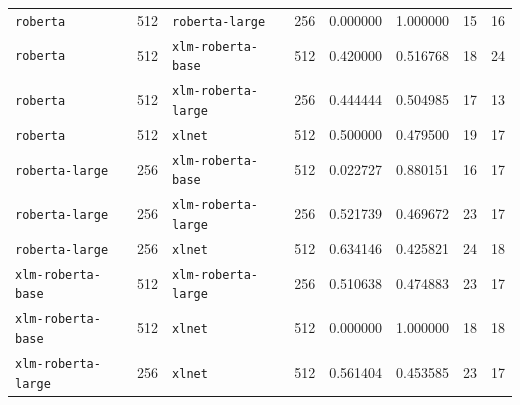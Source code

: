 \documentclass[11pt]{article}
\begin{document}
\begin{landscape}
\begin{longtable}{llllcccc}
\texttt{roberta} & 512 & \texttt{roberta-large} & 256 & 0.000000 & 1.000000 & 15 & 16 \\
\texttt{roberta} & 512 & \texttt{xlm-roberta-base} & 512 & 0.420000 & 0.516768 & 18 & 24 \\
\texttt{roberta} & 512 & \texttt{xlm-roberta-large} & 256 & 0.444444 & 0.504985 & 17 & 13 \\
\texttt{roberta} & 512 & \texttt{xlnet} & 512 & 0.500000 & 0.479500 & 19 & 17 \\
\texttt{roberta-large} & 256 & \texttt{xlm-roberta-base} & 512 & 0.022727 & 0.880151 & 16 & 17 \\
\texttt{roberta-large} & 256 & \texttt{xlm-roberta-large} & 256 & 0.521739 & 0.469672 & 23 & 17 \\
\texttt{roberta-large} & 256 & \texttt{xlnet} & 512 & 0.634146 & 0.425821 & 24 & 18 \\
\texttt{xlm-roberta-base} & 512 & \texttt{xlm-roberta-large} & 256 & 0.510638 & 0.474883 & 23 & 17 \\
\texttt{xlm-roberta-base} & 512 & \texttt{xlnet} & 512 & 0.000000 & 1.000000 & 18 & 18 \\
\texttt{xlm-roberta-large} & 256 & \texttt{xlnet} & 512 & 0.561404 & 0.453585 & 23 & 17 \\
\bottomrule
\end{longtable}
\end{landscape}
\end{document}
